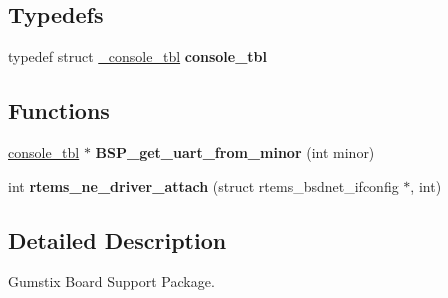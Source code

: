 \subsection*{Typedefs}
\begin{DoxyCompactItemize}
\item 
\mbox{\label{group__RTEMSBSPsARMGumstix_ga87620480bc3e67dcf5efb1ca3e6819da}} 
typedef struct \mbox{\hyperlink{struct__console__tbl}{\+\_\+console\+\_\+tbl}} {\bfseries console\+\_\+tbl}
\end{DoxyCompactItemize}
\subsection*{Functions}
\begin{DoxyCompactItemize}
\item 
\mbox{\label{group__RTEMSBSPsARMGumstix_gaa0c77382e4022ffc14d71265951cbf99}} 
\mbox{\hyperlink{struct__console__tbl}{console\+\_\+tbl}} $\ast$ {\bfseries B\+S\+P\+\_\+get\+\_\+uart\+\_\+from\+\_\+minor} (int minor)
\item 
\mbox{\label{group__RTEMSBSPsARMGumstix_ga6833c75050361282cf7094c83bce1e8d}} 
int {\bfseries rtems\+\_\+ne\+\_\+driver\+\_\+attach} (struct rtems\+\_\+bsdnet\+\_\+ifconfig $\ast$, int)
\end{DoxyCompactItemize}


\subsection{Detailed Description}
Gumstix Board Support Package. 

